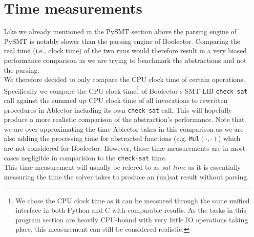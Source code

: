 \section{Time measurements}
Like we already mentioned in the PySMT section above the parsing engine of PySMT is notably slower than the parsing engine of Boolector.
Comparing the real time (i.e., clock time) of the two runs would therefore result in a very biased performance comparison as we are trying
to benchmark the abstractions and not the parsing.\\
We therefore decided to only compare the CPU clock time of certain operations.
Specifically we compare the CPU clock time\footnote{We chose the CPU clock time as it can be measured through the same unified interface in both Python and C with comparable results. As the tasks in this program section are heavily CPU-bound with very little IO operations taking place, this measurement can still be considered realistic.} of Boolector's SMT-LIB \texttt{check-sat} call
against the summed up CPU clock time of all invocations to rewritten procedures in Ablector including its own \texttt{check-sat} call.
This will hopefully produce a more realistic comparison of the abstraction's performance.
Note that we are over-approximating the time Ablector takes in this comparison as we are
also adding the processing time for abstracted functions (e.g. \texttt{Mul$\left(\cdot,\cdot\right)$}) which are not considered for Boolector.
However, those time measurements are in most cases negligible in comparision to the \texttt{check-sat} time.\\
This time measurement will usually be refered to as \textit{sat time} as it is essentially measuring the time the solver takes to produce an (un)sat result without parsing.